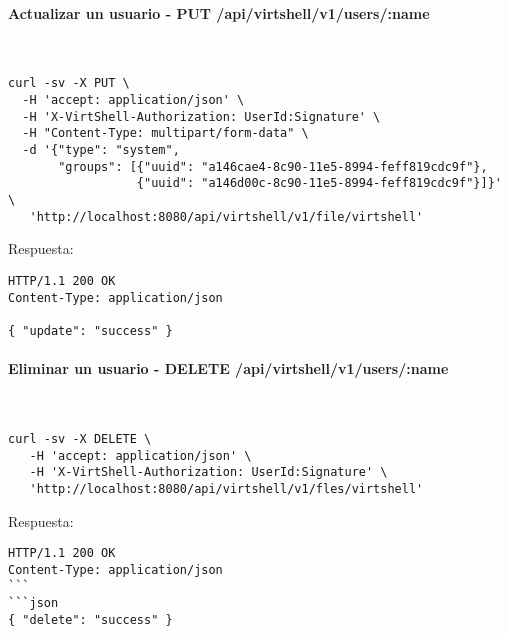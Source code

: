 \paragraph{Actualizar un usuario - PUT /api/virtshell/v1/users/:name} ~\\

\begin{lstlisting}[style=json]
curl -sv -X PUT \
  -H 'accept: application/json' \
  -H 'X-VirtShell-Authorization: UserId:Signature' \
  -H "Content-Type: multipart/form-data" \
  -d '{"type": "system",
       "groups": [{"uuid": "a146cae4-8c90-11e5-8994-feff819cdc9f"},
                  {"uuid": "a146d00c-8c90-11e5-8994-feff819cdc9f"}]}' \
   'http://localhost:8080/api/virtshell/v1/file/virtshell'
\end{lstlisting}

\vspace{1cm}
Respuesta:
\vspace{1cm}

\begin{lstlisting}[style=json]
HTTP/1.1 200 OK
Content-Type: application/json

{ "update": "success" }
\end{lstlisting}


\paragraph{Eliminar un usuario - DELETE /api/virtshell/v1/users/:name} ~\\

\begin{lstlisting}[style=json]
curl -sv -X DELETE \
   -H 'accept: application/json' \
   -H 'X-VirtShell-Authorization: UserId:Signature' \
   'http://localhost:8080/api/virtshell/v1/fles/virtshell'
\end{lstlisting}

\vspace{1cm}
Respuesta:
\vspace{1cm}

\begin{lstlisting}[style=json]
HTTP/1.1 200 OK
Content-Type: application/json
```
```json
{ "delete": "success" }
\end{lstlisting}




